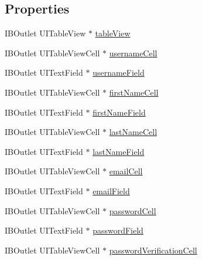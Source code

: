 \subsection*{Properties}
\begin{DoxyCompactItemize}
\item 
I\-B\-Outlet U\-I\-Table\-View $\ast$ \hyperlink{interface_w_user_sign_up_view_controller_abd29ae20dad418bc3e4377a7acddcc11}{table\-View}
\item 
I\-B\-Outlet U\-I\-Table\-View\-Cell $\ast$ \hyperlink{interface_w_user_sign_up_view_controller_a291fe69aca6d536d30ae4fb5909bceb4}{username\-Cell}
\item 
I\-B\-Outlet U\-I\-Text\-Field $\ast$ \hyperlink{interface_w_user_sign_up_view_controller_a6794113b3cbed7f52e3e0ff8214b8eaa}{username\-Field}
\item 
I\-B\-Outlet U\-I\-Table\-View\-Cell $\ast$ \hyperlink{interface_w_user_sign_up_view_controller_a286988ada52eddc14a026573f8975a90}{first\-Name\-Cell}
\item 
I\-B\-Outlet U\-I\-Text\-Field $\ast$ \hyperlink{interface_w_user_sign_up_view_controller_a6ab8e7e8c27f66bb371a54be26e61180}{first\-Name\-Field}
\item 
I\-B\-Outlet U\-I\-Table\-View\-Cell $\ast$ \hyperlink{interface_w_user_sign_up_view_controller_a576801ac423ceaa24ecfd28c5c6d9dfd}{last\-Name\-Cell}
\item 
I\-B\-Outlet U\-I\-Text\-Field $\ast$ \hyperlink{interface_w_user_sign_up_view_controller_a189297ac42b351a49d84b93ecc7b96fb}{last\-Name\-Field}
\item 
I\-B\-Outlet U\-I\-Table\-View\-Cell $\ast$ \hyperlink{interface_w_user_sign_up_view_controller_ae7cabe69d634c5d9f7acef0c2c8e3ba6}{email\-Cell}
\item 
I\-B\-Outlet U\-I\-Text\-Field $\ast$ \hyperlink{interface_w_user_sign_up_view_controller_aa1708be624afd9c921ae60143978b3a6}{email\-Field}
\item 
I\-B\-Outlet U\-I\-Table\-View\-Cell $\ast$ \hyperlink{interface_w_user_sign_up_view_controller_a166bb18d9f587d32a6dca4830c49808e}{password\-Cell}
\item 
I\-B\-Outlet U\-I\-Text\-Field $\ast$ \hyperlink{interface_w_user_sign_up_view_controller_af525329e5da795a72c77396770598b72}{password\-Field}
\item 
I\-B\-Outlet U\-I\-Table\-View\-Cell $\ast$ \hyperlink{interface_w_user_sign_up_view_controller_abd69e2e7db914615b0262ca9f2fed6e6}{password\-Verification\-Cell}
\item 

\end{DoxyCompactItemize}
